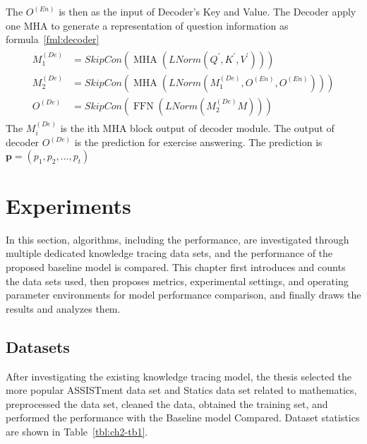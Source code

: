 The \(O^{(En)}\) is then as the input of Decoder's Key and Value. The Decoder apply one MHA to generate a representation of question information as formula~\ref{fml:decoder}
\begin{align}\label{fml:decoder}
	\begin{split}
		M^{(De)}_1 & =SkipCon(\operatorname{MHA}(LNorm(Q^\prime,K^\prime,V^\prime)))    \\
		M^{(De)}_2 & =SkipCon(\operatorname{MHA}(LNorm(M^{(De)}_1 ,O^{(En)},O^{(En)}))) \\
		O^{(De)}   & =SkipCon(\operatorname{FFN}(LNorm(M^{(De)}_2M)))
	\end{split}
\end{align}
The \(M^{(De)}_i\) is the ith MHA block output of decoder module. The output of decoder \(O^{(De)}\) is the prediction for exercise answering. The prediction is \(\mathbf{p}=(p_1,p_2,\ldots,p_t)\)

\section{Experiments}
In this section, algorithms, including the performance, are investigated through multiple dedicated knowledge tracing data sets, and the performance of the proposed baseline model is compared. This chapter first introduces and counts the data sets used, then proposes metrics, experimental settings, and operating parameter environments for model performance comparison, and finally draws the results and analyzes them.


\subsection{Datasets}
After investigating the existing knowledge tracing model, the thesis selected the more popular ASSISTment data set and Statics data set related to mathematics, preprocessed the data set, cleaned the data, obtained the training set, and performed the performance with the Baseline model Compared. Dataset statistics are shown in Table~\ref{tbl:ch2-tb1}.

